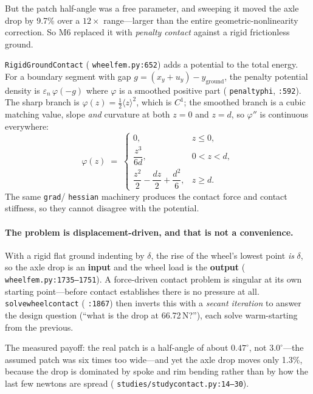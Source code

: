 \documentclass[11pt,a4paper]{article}
\DeclareRobustCommand{\code}[1]{%
  \texttt{\small\def\_{\textunderscore\discretionary{}{}{}}#1}}
\newcommand{\at}[2]{\code{#1:#2}}
\begin{document}
But the patch half-angle was a free parameter, and sweeping it moved the axle drop by
9.7\% over a $12\times$ range---larger than the entire geometric-nonlinearity
correction. So M6 replaced it with \emph{penalty contact} against a rigid frictionless
ground.

\code{RigidGroundContact} (\at{wheel\_fem.py}{652}) adds a potential to the total
energy. For a boundary segment with gap $g = (x_y + u_y) - y_{\text{ground}}$, the
penalty potential density is $\varepsilon_n\,\varphi(-g)$ where $\varphi$ is a smoothed
positive part (\code{\_penalty\_phi}, \code{:592}). The sharp branch is
$\varphi(z) = \tfrac12\langle z\rangle^2$, which is $C^1$; the smoothed branch is a
cubic matching value, slope \emph{and} curvature at both $z = 0$ and $z = d$, so
$\varphi''$ is continuous everywhere:
%
\begin{equation}
  \varphi(z) \;=\;
  \begin{cases}
    0, & z \le 0,\\[2pt]
    \dfrac{z^3}{6d}, & 0 < z < d,\\[6pt]
    \dfrac{z^2}{2} - \dfrac{dz}{2} + \dfrac{d^2}{6}, & z \ge d .
  \end{cases}
  \label{eq:penalty}
\end{equation}
%
The same \code{grad}/\code{hessian} machinery produces the contact force and contact
stiffness, so they cannot disagree with the potential.

\paragraph{The problem is displacement-driven, and that is not a convenience.}
With a rigid flat ground indenting by $\delta$, the rise of the wheel's lowest point
\emph{is} $\delta$, so the axle drop is an \textbf{input} and the wheel load is the
\textbf{output} (\at{wheel\_fem.py}{1735--1751}). A force-driven contact problem is
singular at its own starting point---before contact establishes there is no pressure at
all. \code{solve\_wheel\_contact} (\code{:1867}) then inverts this with a \emph{secant
iteration} to answer the design question (``what is the drop at 66.72\,N?''), each
solve warm-starting from the previous.

The measured payoff: the real patch is a half-angle of about \textbf{$0.47^\circ$}, not
$3.0^\circ$---the assumed patch was six times too wide---and yet the axle drop moves
only 1.3\%, because the drop is dominated by spoke and rim bending rather than by how
the last few newtons are spread (\at{studies/study\_contact.py}{14--30}).
\end{document}
